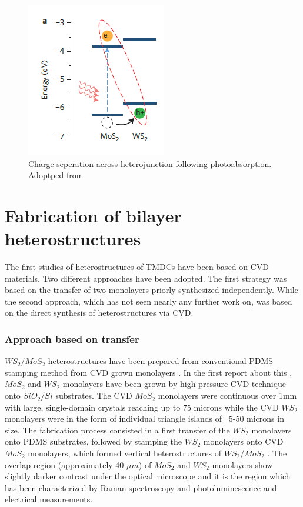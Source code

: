 \begin{figure}[H]
	\begin{center}
		\includegraphics[scale=1]{Heterostructures/HeterostructureChargeSeparationDiagram.png}
		\caption{Charge seperation across heterojunction following photoabsorption. Adoptped from \cite{Hong2014}}
		\label{fig:HeterostructuresChargeSeperationDiagram}
	\end{center}
\end{figure}

\section{Fabrication of bilayer heterostructures}

The first studies of heterostructures of TMDCs have been based on CVD materials. Two different approaches have been adopted. The first strategy was based on the transfer of two monolayers priorly synthesized independently. While the second approach, which has not seen nearly any further work on, was based on the direct synthesis of heterostructures via CVD. 

\subsubsection{Approach based on transfer}

$WS_2$/$MoS_2$ heterostructures have been prepared from conventional PDMS stamping method from CVD grown monolayers \cite{Tongay2014}. In the first report about this \cite{Gong2014}, $MoS_2$ and $WS_2$ monolayers have been grown by high-pressure CVD technique onto $SiO_2/Si$ substrates. The CVD $MoS_2$ monolayers were continuous over 1mm with large, single-domain crystals reaching up to 75 microns while the CVD $WS_2$ monolayers were in the form of individual triangle islands of ~5-50 microns in size. 
The fabrication process consisted in a first transfer of the $WS_2$ monolayers onto PDMS substrates, followed by stamping the $WS_2$ monolayers onto CVD $MoS_2$ monolayers, which formed vertical heterostructures of $WS_2$/$MoS_2$ \cite{Tongay2014}. The overlap region (approximately 40 ${\mu}m$) of $MoS_2$ and $WS_2$ monolayers show slightly darker contrast under the optical microscope and it is the region which has been characterized by Raman spectroscopy and photoluminescence and electrical measurements.

